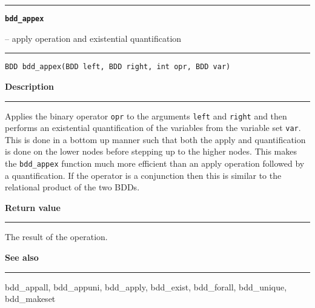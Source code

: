 \begin{minipage}{\textwidth}

\noindent\begin{minipage}{\textwidth}
\rule{\textwidth}{0.5mm}
{\tt\bf bdd\_appex }
\--- apply operation and existential quantification  \hspace{\fill}
\\\rule[1.5ex]{\textwidth}{0.5mm}
\end{minipage}

\noindent\begin{verbatim}
BDD bdd_appex(BDD left, BDD right, int opr, BDD var) 
\end{verbatim}

\vspace{\parsep}\noindent
{\bf Description}\\\rule[1.5ex]{\textwidth}{0.2mm}\vspace{-1.5ex}\setlength{\parindent}{1em}
Applies the binary operator {\tt opr} to the arguments
           {\tt left} and {\tt right} and then performs an existential
	   quantification of the variables from the variable set
	   {\tt var}. This is done in a bottom up manner such that both the
	   apply and quantification is done on the lower nodes before
	   stepping up to the higher nodes. This makes the {\tt bdd\_appex}
	   function much more efficient than an apply operation followed
	   by a quantification. If the operator is a conjunction then this
	   is similar to the relational product of the two BDDs.

\setlength{\parindent}{0em}\vspace{\parsep}\vspace{\baselineskip}\noindent
{\bf Return value}\\\rule[1.5ex]{\textwidth}{0.2mm}\vspace{-1.5ex}
The result of the operation. 

\vspace{\parsep}\vspace{\baselineskip}\noindent
{\bf See also}\\\rule[1.5ex]{\textwidth}{0.2mm}\vspace{-1.5ex}
bdd\_appall, bdd\_appuni, bdd\_apply, bdd\_exist, bdd\_forall, bdd\_unique, bdd\_makeset 
\end{minipage}
\vspace{8ex}
